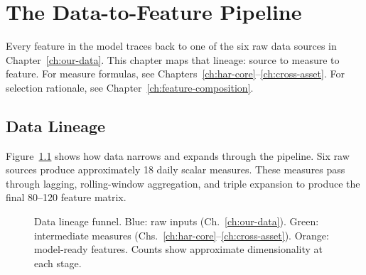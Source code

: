 \chapter{The Data-to-Feature Pipeline}
\label{ch:pipeline}

Every feature in the model traces back to one of the six raw data sources in Chapter~\ref{ch:our-data}.
This chapter maps that lineage: source to measure to feature.
For measure formulas, see Chapters~\ref{ch:har-core}--\ref{ch:cross-asset}.
For selection rationale, see Chapter~\ref{ch:feature-composition}.


\section{Data Lineage}
\label{sec:data-lineage}

Figure~\ref{fig:data-funnel} shows how data narrows and expands through the pipeline.
Six raw sources produce approximately 18 daily scalar measures.
These measures pass through lagging, rolling-window aggregation, and triple expansion to produce the final 80--120 feature matrix.

\begin{figure}[htbp]
\centering
{}
\caption{Data lineage funnel.
Blue: raw inputs (Ch.~\ref{ch:our-data}).
Green: intermediate measures (Chs.~\ref{ch:har-core}--\ref{ch:cross-asset}).
Orange: model-ready features.
Counts show approximate dimensionality at each stage.}
\label{fig:data-funnel}
\end{figure}


